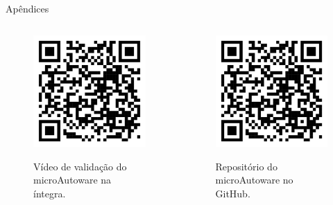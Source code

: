 \documentclass{if-beamer}
\begin{document}
\begin{frame}{Apêndices}
	
	\begin{columns}
		
		\begin{column}{0.5\textwidth}
			
			\begin{figure}[H]
				\centering
				\href{https://youtu.be/7OOIyOqvU_o}{\includegraphics[width=0.8\linewidth]{qr_code_youtube}}
				\caption{Vídeo de validação do microAutoware na íntegra.}
				\label{fig:qr_code_youtube}
			\end{figure}
		
		
			
		\end{column}
		
		\begin{column}{0.5\textwidth}
			
			\begin{figure}[H]
				\centering
				\href{https://youtu.be/7OOIyOqvU_o}{\includegraphics[width=0.8\linewidth]{qr_code_youtube}}
				\caption{Repositório do microAutoware no GitHub.}
				\label{fig:qr_code_github}
			\end{figure}
			

\end{column}
\end{columns}
\end{frame}
\end{document}
